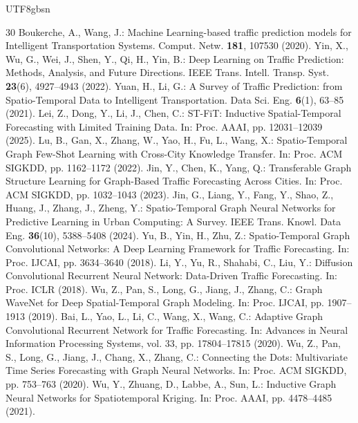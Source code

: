 \documentclass[runningheads,a4paper]{llncs}
\begin{document}
\begin{CJK*}{UTF8}{gbsn}
\begin{thebibliography}{30}
 Boukerche, A., Wang, J.: Machine Learning-based traffic prediction models for Intelligent Transportation Systems. Comput. Netw. \textbf{181}, 107530 (2020).
 Yin, X., Wu, G., Wei, J., Shen, Y., Qi, H., Yin, B.: Deep Learning on Traffic Prediction: Methods, Analysis, and Future Directions. IEEE Trans. Intell. Transp. Syst. \textbf{23}(6), 4927--4943 (2022).
 Yuan, H., Li, G.: A Survey of Traffic Prediction: from Spatio-Temporal Data to Intelligent Transportation. Data Sci. Eng. \textbf{6}(1), 63--85 (2021). %
 Lei, Z., Dong, Y., Li, J., Chen, C.: ST-FiT: Inductive Spatial-Temporal Forecasting with Limited Training Data. In: Proc. AAAI, pp. 12031--12039 (2025).
 Lu, B., Gan, X., Zhang, W., Yao, H., Fu, L., Wang, X.: Spatio-Temporal Graph Few-Shot Learning with Cross-City Knowledge Transfer. In: Proc. ACM SIGKDD, pp. 1162--1172 (2022). 
 Jin, Y., Chen, K., Yang, Q.: Transferable Graph Structure Learning for Graph-Based Traffic Forecasting Across Cities. In: Proc. ACM SIGKDD, pp. 1032--1043 (2023).
 Jin, G., Liang, Y., Fang, Y., Shao, Z., Huang, J., Zhang, J., Zheng, Y.: Spatio-Temporal Graph Neural Networks for Predictive Learning in Urban Computing: A Survey. IEEE Trans. Knowl. Data Eng. \textbf{36}(10), 5388--5408 (2024). 
 Yu, B., Yin, H., Zhu, Z.: Spatio-Temporal Graph Convolutional Networks: A Deep Learning Framework for Traffic Forecasting. In: Proc. IJCAI, pp. 3634--3640 (2018). 
 Li, Y., Yu, R., Shahabi, C., Liu, Y.: Diffusion Convolutional Recurrent Neural Network: Data-Driven Traffic Forecasting. In: Proc. ICLR (2018).
 Wu, Z., Pan, S., Long, G., Jiang, J., Zhang, C.: Graph WaveNet for Deep Spatial-Temporal Graph Modeling. In: Proc. IJCAI, pp. 1907--1913 (2019). 
 Bai, L., Yao, L., Li, C., Wang, X., Wang, C.: Adaptive Graph Convolutional Recurrent Network for Traffic Forecasting. In: Advances in Neural Information Processing Systems, vol. 33, pp. 17804--17815 (2020).
 Wu, Z., Pan, S., Long, G., Jiang, J., Chang, X., Zhang, C.: Connecting the Dots: Multivariate Time Series Forecasting with Graph Neural Networks. In: Proc. ACM SIGKDD, pp. 753--763 (2020). 
 Wu, Y., Zhuang, D., Labbe, A., Sun, L.: Inductive Graph Neural Networks for Spatiotemporal Kriging. In: Proc. AAAI, pp. 4478--4485 (2021). 

\end{thebibliography}
\end{CJK*}
\end{document}
